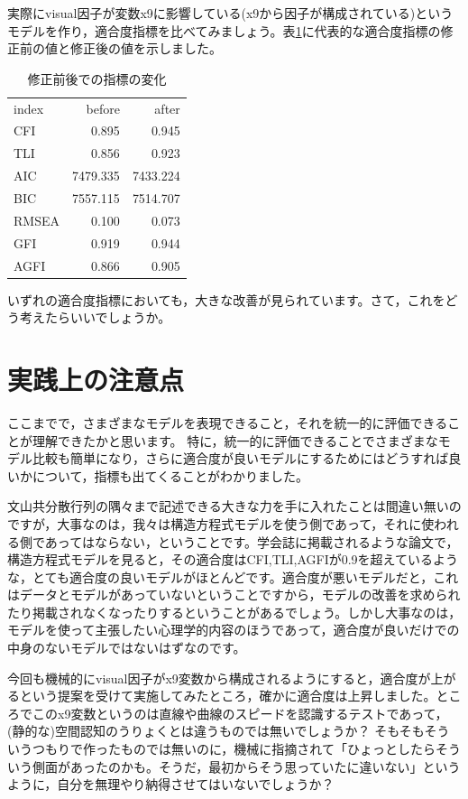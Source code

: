 \documentclass{ltjsbook}
\begin{document}
実際にvisual因子が変数x9に影響している(x9から因子が構成されている)というモデルを作り，適合度指標を比べてみましょう。表\ref{tab:13_02}に代表的な適合度指標の修正前の値と修正後の値を示しました。
\begin{table}
    \caption{修正前後での指標の変化}
    \centering
    \begin{tabular}[t]{l|rr}
    \hline
    index & before & after\\
    CFI & 0.895 & 0.945\\
    TLI & 0.856 & 0.923\\
    AIC & 7479.335 & 7433.224\\
    BIC & 7557.115 & 7514.707\\
    RMSEA & 0.100 & 0.073\\
    GFI & 0.919 & 0.944\\
    AGFI & 0.866 & 0.905\\
    \hline
    \end{tabular}
    \label{tab:13_02}
    \end{table}
いずれの適合度指標においても，大きな改善が見られています。さて，これをどう考えたらいいでしょうか。

\section{実践上の注意点}
ここまでで，さまざまなモデルを表現できること，それを統一的に評価できることが理解できたかと思います。
特に，統一的に評価できることでさまざまなモデル比較も簡単になり，さらに適合度が良いモデルにするためにはどうすれば良いかについて，指標も出てくることがわかりました。

文山共分散行列の隅々まで記述できる大きな力を手に入れたことは間違い無いのですが，大事なのは，我々は構造方程式モデルを使う側であって，それに使われる側であってはならない，ということです。学会誌に掲載されるような論文で，構造方程式モデルを見ると，その適合度はCFI,TLI,AGFIが0.9を超えているような，とても適合度の良いモデルがほとんどです。適合度が悪いモデルだと，これはデータとモデルがあっていないということですから，モデルの改善を求められたり掲載されなくなったりするということがあるでしょう。しかし大事なのは，モデルを使って主張したい心理学的内容のほうであって，適合度が良いだけでの中身のないモデルではないはずなのです。

今回も機械的にvisual因子がx9変数から構成されるようにすると，適合度が上がるという提案を受けて実施してみたところ，確かに適合度は上昇しました。ところでこのx9変数というのは直線や曲線のスピードを認識するテストであって，(静的な)空間認知のうりょくとは違うものでは無いでしょうか？ そもそもそういうつもりで作ったものでは無いのに，機械に指摘されて「ひょっとしたらそういう側面があったのかも。そうだ，最初からそう思っていたに違いない」というように，自分を無理やり納得させてはいないでしょうか？ 
\end{document}

